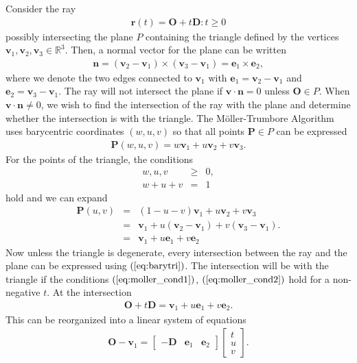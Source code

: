 \documentclass [12pt, a4paper] {article}
\newcommand{\vc}[1]
{
	\boldsymbol{#1}
}
\begin{document}
Consider the ray 
\begin {eqnarray}
    \vc r(t) = \vc O + t\vc D : t \geq 0
\end {eqnarray}
possibly intersecting the plane $P$ containing the triangle defined by the vertices 
$\vc v_1, \vc v_2, \vc v_3\in\mathbb{R}^3$. Then, a normal vector for the plane can be 
written 
\begin {eqnarray}
    \vc n = (\vc v_2 - \vc v_1)\times (\vc v_3 - \vc v_1)
    = \vc e_1 \times \vc e_2,
\end {eqnarray}
where we denote the two edges connected to $\vc v_1$ with 
$\vc e_1 = \vc v_2 - \vc v_1$ and 
$\vc e_2 = \vc v_3 - \vc v_1$.
The ray will not intersect the plane if $\vc v\cdot\vc n  = 0$ unless $\vc O\in P$.
When $\vc v\cdot\vc n\neq 0$, we wish to find the intersection of the ray with the 
plane and determine whether the intersection is with the triangle. The 
M{\"o}ller-Trumbore Algorithm uses barycentric coordinates $(w, u, v)$ so that 
all points $\vc P\in P$ can be expressed
\begin {eqnarray}
    \vc P(w, u, v) = w\vc v_1 + u\vc v_2 + v\vc v_3.
\end {eqnarray}
For the points of the triangle, the conditions 
\begin {eqnarray}
    \label{eq:moller_cond1}
    w, u, v &\geq& 0, \\
    \label{eq:moller_cond2}
    w + u + v &=& 1
\end {eqnarray}
hold and we can expand
\begin {eqnarray}
    \vc P(u, v) &=& (1 - u - v)\vc v_1 + u\vc v_2 + v\vc v_3
    \\
    &=& \vc v_1 + u(\vc v_2 - \vc v_1) + v(\vc v_3 - \vc v_1).
    \\
    \label{eq:barytri}
    &=& \vc v_1 + u\vc e_1 + v\vc e_2
\end {eqnarray}
Now unless the triangle is degenerate, every intersection between the ray and 
the plane can be expressed using $(\ref{eq:barytri})$. The intersection will 
be with the triangle if the conditions $(\ref{eq:moller_cond1})$, 
$(\ref{eq:moller_cond2})$ hold for a non-negative $t$. At the intersection 
\begin {eqnarray}
    \vc O + t\vc D = \vc v_1 + u\vc e_1 + v\vc e_2.
\end {eqnarray}
This can be reorganized into a linear system of equations 
\begin {eqnarray}
    \label{eq:moller_lin}
    \vc O - \vc v_1 
    =
    \begin {bmatrix}
        -\vc D & \vc e_1 & \vc e_2
    \end {bmatrix}
    \begin {bmatrix}
        t \\ u \\ v
    \end {bmatrix}.
\end {eqnarray}
\end{document}
